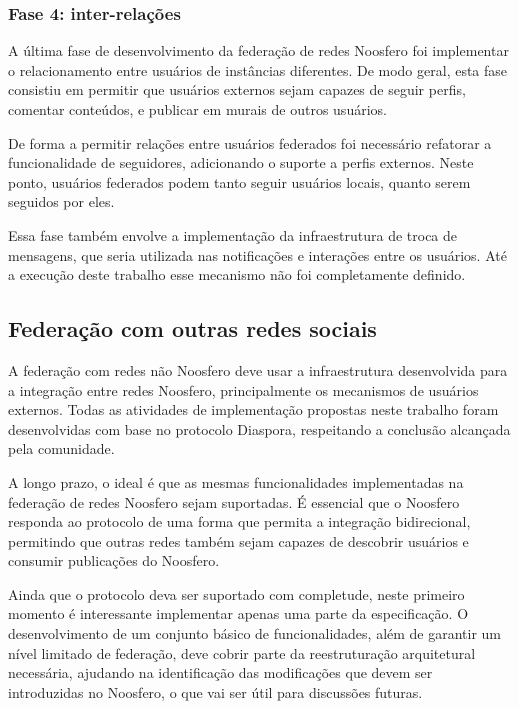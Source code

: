 \subsubsection{Fase 4: inter-relações}

A última fase de desenvolvimento da federação de redes Noosfero foi implementar o
relacionamento entre usuários de instâncias diferentes. De modo geral, esta fase
consistiu em permitir que usuários externos sejam capazes de seguir perfis, comentar
conteúdos, e publicar em murais de outros usuários.

De forma a permitir relações entre usuários federados foi necessário refatorar a
funcionalidade de seguidores, adicionando o suporte a perfis externos. Neste ponto,
usuários federados podem tanto seguir usuários locais, quanto serem seguidos por
eles.

Essa fase também envolve a implementação da infraestrutura de troca de mensagens,
que seria utilizada nas notificações e interações entre os usuários. Até a
execução deste trabalho esse mecanismo não foi completamente definido.


\subsection{Federação com outras redes sociais}
\label{subsec:federacao_externa}

A federação com redes não Noosfero deve usar a infraestrutura desenvolvida para a
integração entre redes Noosfero, principalmente os mecanismos de usuários externos.
Todas as atividades de implementação propostas neste trabalho foram desenvolvidas
com base no protocolo Diaspora, respeitando a conclusão alcançada pela comunidade.

A longo prazo, o ideal é que as mesmas funcionalidades implementadas na federação de
redes Noosfero sejam suportadas. É essencial que o Noosfero responda ao protocolo de
uma forma que permita a integração bidirecional, permitindo que outras redes
também sejam capazes de descobrir usuários e consumir publicações do Noosfero.

Ainda que o protocolo deva ser suportado com completude, neste primeiro momento é
interessante implementar apenas uma parte da especificação. O desenvolvimento de um
conjunto básico de funcionalidades, além de garantir um nível limitado de federação,
deve cobrir parte da reestruturação arquitetural necessária, ajudando na
identificação das modificações que devem ser introduzidas no Noosfero, o que vai ser
útil para discussões futuras.

